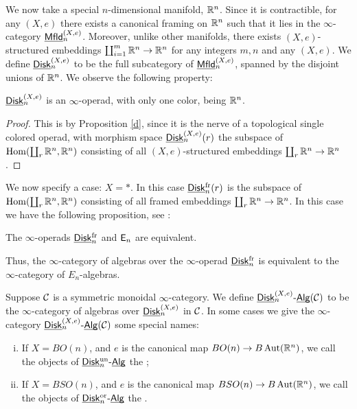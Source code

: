 \documentclass[twoside]{article}
\begin{document}
We now take a special $n$-dimensional manifold, $\mathbb{R}^n$. Since it is
contractible, for any $(X,e)$ there exists a canonical framing on $\mathbb{R}^n$
such that it lies in the $\infty$-category $\underline{\smash{\mathsf{Mfld}}}_n^{(X,e)}$.
Moreover, unlike other manifolds, there exists $(X,e)$-structured embeddings
$\coprod_{i=1}^m\mathbb{R}^n\to\mathbb{R}^n$ for any integers $m,n$ and any $(X,e)$. We define 
$\underline{\smash{\mathsf{Disk}}}_n^{(X,e)}$ to be the full subcategory of $\underline{\smash{\mathsf{Mfld}}}_n^{(X,e)}$,
spanned by the disjoint unions of $\mathbb{R}^n$. We observe the following property:

\begin{proposition}
    $\underline{\smash{\mathsf{Disk}}}_n^{(X,e)}$ is an $\infty$-operad, with only one color, being
    $\mathbb{R}^n$.
\end{proposition}

\begin{proof}
    This is by Proposition \ref{d}, since it is the nerve of a topological
    single colored operad, with morphism space $\underline{\smash{\mathsf{Disk}}}_n^{(X,e)}(r)$ the subspace
    of $\operatorname{Hom}(\coprod_r\mathbb{R}^n,\mathbb{R}^n)$ consisting of all $(X,e)$-structured embeddings
    $\coprod_r\mathbb{R}^n\to\mathbb{R}^n$.
\end{proof}

We now specify a case: $X=*$. In this case $\underline{\smash{\mathsf{Disk}}}_n^{\mathrm{fr}}(r)$ is the subspace
of $\operatorname{Hom}(\coprod_r\mathbb{R}^n,\mathbb{R}^n)$ consisting of all framed embeddings 
$\coprod_r\mathbb{R}^n\to\mathbb{R}^n$. In this case we have the following proposition, see \cite{MO181828}:

\begin{proposition}
    The $\infty$-operads $\underline{\smash{\mathsf{Disk}}}_n^{\mathrm{fr}}$ and $\mathsf{E}_n$ are equivalent.
\end{proposition}

Thus, the $\infty$-category of algebras over the $\infty$-operad $\underline{\smash{\mathsf{Disk}}}_n^{\mathrm{fr}}$
is equivalent to the $\infty$-category of $E_n$-algebras.

\begin{definition}
    Suppose $\cal C$ is a symmetric monoidal $\infty$-category.
    We define $\underline{\smash{\mathsf{Disk}}}_n^{(X,e)}\text{-}\underline{\smash{\mathsf{Alg}}}(\cal C)$ to be the $\infty$-category of 
    algebras over $\underline{\smash{\mathsf{Disk}}}_n^{(X,e)}$ in $\cal C$. In some cases we give 
    the $\infty$-category $\underline{\smash{\mathsf{Disk}}}_n^{(X,e)}\text{-}\underline{\smash{\mathsf{Alg}}}(\cal C)$ some special names:
    \begin{enumerate}[i)]
        \item If $X=BO(n)$, and $e$ is the canonical map $BO(n)\to B\operatorname{Aut}(\mathbb{R}^n)$,
        we call the objects of $\underline{\smash{\mathsf{Disk}}}_n^{\mathrm{un}}\text{-}\underline{\smash{\mathsf{Alg}}}$ the ;
        \item If $X=BSO(n)$, and $e$ is the canonical map $BSO(n)\to B\operatorname{Aut}(\mathbb{R}^n)$,
        we call the objects of $\underline{\smash{\mathsf{Disk}}}_n^{\mathrm{or}}\text{-}\underline{\smash{\mathsf{Alg}}}$ the .
    \end{enumerate}
\end{definition}
    
\end{document}

